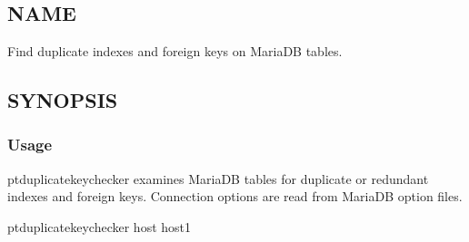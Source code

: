 \documentclass[letterpaper,10pt,english]{sphinxmanual}
\begin{document}
\chapter{}
\label{\detokenize{mariadb-index-checker:mariadb-index-checker}}\label{\detokenize{mariadb-index-checker::doc}}

\section{NAME}
\label{\detokenize{mariadb-index-checker:name}}
\sphinxAtStartPar
{} \sphinxhyphen{} Find duplicate indexes and foreign keys on MariaDB tables.


\section{SYNOPSIS}
\label{\detokenize{mariadb-index-checker:synopsis}}

\subsection{Usage}
\label{\detokenize{mariadb-index-checker:usage}}
\begin{sphinxVerbatim}[commandchars=\\\{\}]
 \PYG{p}{[}\PYG{p}{]} \PYG{p}{[}\PYG{p}{]}
\end{sphinxVerbatim}

\sphinxAtStartPar
pt\sphinxhyphen{}duplicate\sphinxhyphen{}key\sphinxhyphen{}checker examines MariaDB tables for duplicate or redundant
indexes and foreign keys.  Connection options are read from MariaDB option files.

\begin{sphinxVerbatim}[commandchars=\\\{\}]
pt\PYGZhy{}duplicate\PYGZhy{}key\PYGZhy{}checker \PYGZhy{}\PYGZhy{}host host1
\end{sphinxVerbatim}
\end{document}
